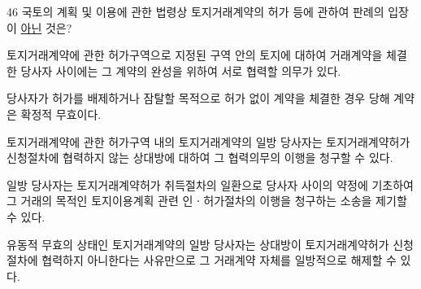 \begin{question}{46}
국토의 계획 및 이용에 관한 법령상 토지거래계약의 허가 등에 관하여 판례의 입장이 \uline{아닌} 것은?
\begin{choices}
  \item 토지거래계약에 관한 허가구역으로 지정된 구역 안의 토지에 대하여 거래계약을 체결한 당사자 사이에는 그 계약의 완성을 위하여 서로 협력할 의무가 있다.
  \item 당사자가 허가를 배제하거나 잠탈할 목적으로 허가 없이 계약을 체결한 경우 당해 계약은 확정적 무효이다.
  \item 토지거래계약에 관한 허가구역 내의 토지거래계약의 일방 당사자는 토지거래계약허가 신청절차에 협력하지 않는 상대방에 대하여 그 협력의무의 이행을 청구할 수 있다.
  \item 일방 당사자는 토지거래계약허가 취득절차의 일환으로 당사자 사이의 약정에 기초하여 그 거래의 목적인 토지이용계획 관련 인ㆍ허가절차의 이행을 청구하는 소송을 제기할 수 있다.
  \item 유동적 무효의 상태인 토지거래계약의 일방 당사자는 상대방이 토지거래계약허가 신청절차에 협력하지 아니한다는 사유만으로 그 거래계약 자체를 일방적으로 해제할 수 있다.
\end{choices}
\end{question}
